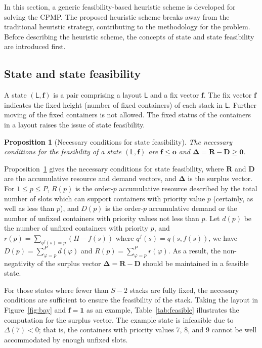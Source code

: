 \documentclass[review,3p,times,12pt,number]{elsarticle}\usepackage{amsmath}\usepackage{amssymb}
\newtheorem{proposition}{Proposition}
\begin{document}
In this section, a generic feasibility-based heuristic scheme is developed for solving the CPMP\@. The proposed heuristic scheme breaks away from the traditional heuristic strategy, contributing to the methodology for the problem. Before describing the heuristic scheme, the concepts of state and state feasibility are introduced first.

\subsection{State and state feasibility}
\label{sec:state}

A state $(\mathsf{L},\boldsymbol{f})$ is a pair comprising a layout $\mathsf{L}$ and a fix vector $\boldsymbol{f}$. The {fix} vector $\boldsymbol{f}$ indicates the fixed height (number of fixed containers) of each stack in $\mathsf{L}$. Further moving of the fixed containers is not allowed. The fixed status of the containers in a layout raises the issue of state feasibility.

\begin{proposition}[Necessary conditions for state feasibility]\label{prop:necessary}
The necessary conditions for the feasibility of a state $(\mathsf{L},\boldsymbol{f})$ are $\boldsymbol{f}\le \boldsymbol{o}$ and $\boldsymbol{\Delta}=\boldsymbol{R}-\boldsymbol{D}\ge \boldsymbol{0}$.
\end{proposition}



Proposition~\ref{prop:necessary} gives the necessary conditions for state feasibility, where $\boldsymbol{R}$ and $\boldsymbol{D}$ are the accumulative resource and demand vectors, and $\boldsymbol{\Delta}$ is the surplus vector. For $1\le p\le P$, $R(p)$ is the order-$p$ accumulative resource described by the total number of slots which can support containers with priority value $p$ (certainly, as well as less than $p$), and $D(p)$ is the order-$p$ accumulative demand or the number of unfixed containers with priority values not less than $p$. Let $d(p)$ be the number of unfixed containers with priority $p$, and $r(p)=\sum_{q^f(s)=p} (H-f(s))$ where $q^f(s)=q(s,f(s))$, we have $D(p)=\sum_{\varphi=p}^P d(\varphi)$ and $R(p)=\sum_{\varphi=p}^P r(\varphi)$. As a result, the non-negativity of the surplus vector $\boldsymbol{\Delta}=\boldsymbol{R}-\boldsymbol{D}$ should be maintained in a feasible state.



For those states where fewer than $S-2$ stacks are fully fixed, the necessary conditions are sufficient to ensure the feasibility of the stack. Taking the layout in Figure~\ref{fig:bay} and $\boldsymbol{f}=\boldsymbol{1}$ as an example, Table~\ref{tab:feasible} illustrates the computation for the surplus vector. The example state is infeasible due to $\Delta(7)<0$; that is, the containers with priority values 7, 8, and 9 cannot be well accommodated by enough unfixed slots.
\end{document}
